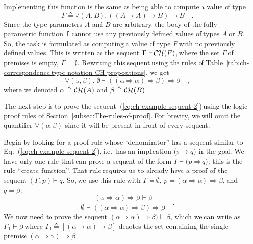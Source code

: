 \noindent Implementing this function is the same as being able to
compute a value of type 
\[
F\triangleq\forall(A,B).\,((A\rightarrow A)\rightarrow B)\rightarrow B\quad.
\]
Since the type parameters $A$ and $B$ are arbitrary, the body of
the fully parametric function \lstinline!f! cannot use any previously
defined values of types $A$ or $B$. So, the task is formulated as
computing a value of type $F$ with no previously defined values.
This is written as the sequent $\Gamma\vdash{\cal CH}(F)$, where
the set $\Gamma$ of premises is empty, $\Gamma=\emptyset$. Rewriting
this sequent using the rules of Table~\ref{tab:ch-correspondence-type-notation-CH-propositions},
we get
\begin{equation}
\forall(\alpha,\beta).\;\emptyset\vdash((\alpha\Rightarrow\alpha)\Rightarrow\beta)\Rightarrow\beta\quad,\label{eq:ch-example-sequent-2}
\end{equation}
where we denoted $\alpha\triangleq{\cal CH}(A)$ and $\beta\triangleq{\cal CH}(B)$. 

The next step is to prove the sequent~(\ref{eq:ch-example-sequent-2})
using the logic proof rules of Section~\ref{subsec:The-rules-of-proof}.
For brevity, we will omit the quantifier $\forall(\alpha,\beta)$
since it will be present in front of every sequent.

Begin by looking for a proof rule whose ``denominator'' has a sequent
similar to Eq.~(\ref{eq:ch-example-sequent-2}), i.e.~has an implication
($p\rightarrow q$) in the goal. We have only one rule that can prove
a sequent of the form $\Gamma\vdash(p\Rightarrow q$); this is the
rule ``$\text{create function}$''. That rule requires us to already
have a proof of the sequent $(\Gamma,p)\vdash q$. So, we use this
rule with $\Gamma=\emptyset$, $p=(\alpha\Rightarrow\alpha)\Rightarrow\beta$,
and $q=\beta$: 
\[
\frac{(\alpha\Rightarrow\alpha)\Rightarrow\beta\vdash\beta}{\emptyset\vdash((\alpha\Rightarrow\alpha)\Rightarrow\beta)\Rightarrow\beta}\quad.
\]
We now need to prove the sequent $(\alpha\Rightarrow\alpha)\Rightarrow\beta)\vdash\beta$,
which we can write as $\Gamma_{1}\vdash\beta$ where $\Gamma_{1}\triangleq[(\alpha\rightarrow\alpha)\rightarrow\beta]$
denotes the set containing the single premise $(\alpha\Rightarrow\alpha)\Rightarrow\beta$. 

